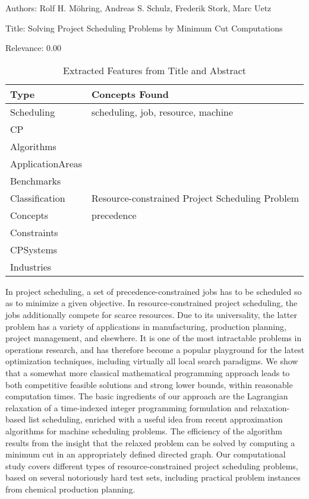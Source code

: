 Authors: Rolf H. Möhring, Andreas S. Schulz, Frederik Stork, Marc Uetz

Title: Solving Project Scheduling Problems by Minimum Cut Computations

Relevance:  0.00

{\scriptsize
\begin{longtable}{p{2cm}p{20cm}}
\caption{Extracted Features from Title and Abstract}\\ \toprule
Type & Concepts Found\\ \midrule
\endhead
\bottomrule
\endfoot
Scheduling & scheduling, job, resource, machine\\ 
CP & \\ 
Algorithms & \\ 
ApplicationAreas & \\ 
Benchmarks & \\ 
Classification & Resource-constrained Project Scheduling Problem\\ 
Concepts & precedence\\ 
Constraints & \\ 
CPSystems & \\ 
Industries & \\ 
\end{longtable}
}

  In project scheduling, a set of precedence-constrained jobs has to be scheduled so as to minimize a given objective. In resource-constrained project scheduling, the jobs additionally compete for scarce resources. Due to its universality, the latter problem has a variety of applications in manufacturing, production planning, project management, and elsewhere. It is one of the most intractable problems in operations research, and has therefore become a popular playground for the latest optimization techniques, including virtually all local search paradigms. We show that a somewhat more classical mathematical programming approach leads to both competitive feasible solutions and strong lower bounds, within reasonable computation times. The basic ingredients of our approach are the Lagrangian relaxation of a time-indexed integer programming formulation and relaxation-based list scheduling, enriched with a useful idea from recent approximation algorithms for machine scheduling problems. The efficiency of the algorithm results from the insight that the relaxed problem can be solved by computing a minimum cut in an appropriately defined directed graph. Our computational study covers different types of resource-constrained project scheduling problems, based on several notoriously hard test sets, including practical problem instances from chemical production planning.  

